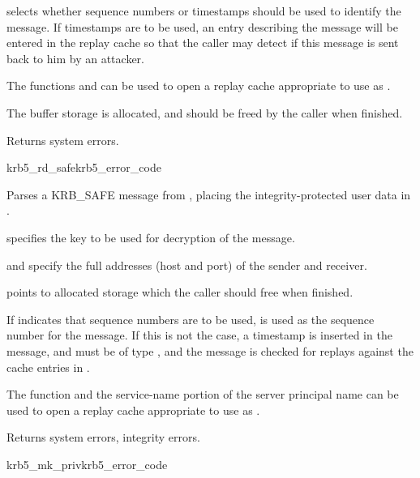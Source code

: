  selects whether sequence numbers or timestamps
should be used to identify the message.  If timestamps are to be used,
an entry describing the message will be entered in the replay cache
 so that the caller may detect if this message is sent
back to him by an attacker.

The functions  and
 can be used to open a replay cache
appropriate to use as .

The  buffer storage is allocated, and should be freed by the
caller when finished.

Returns system errors.

\begin{funcdecl}{krb5_rd_safe}{krb5_error_code}{\funcin}
\funcinout
{}
\funcout
{}
\end{funcdecl}

Parses a KRB_SAFE message from , placing the
integrity-protected user data in .

 specifies the key to be used for decryption of the message.
 
 and  specify the full
addresses (host and port) of the sender and receiver.

 points to allocated storage which the caller should
free when finished.

If  indicates that sequence numbers are to be
used,  is used as the sequence number for the
message.  If this is not the case, a timestamp is inserted in the
message, and  must be of type
, and the message is checked for replays
against the cache entries in .

The function  and the service-name
portion of the server principal name can be used to open a
replay cache appropriate to use as .

Returns system errors, integrity errors.

\begin{funcdecl}{krb5_mk_priv}{krb5_error_code}{\funcin}
\funcinout
{}
\funcout
{}
\end{funcdecl}

